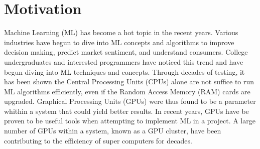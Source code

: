 \section*{Motivation}
\label{sec:Motivation}

Machine Learning (ML) has become a hot topic in the recent years. 
Various industries have begun to dive into ML concepts and algorithms  
to improve decision making, predict market sentiment, and understand consumers. 
College undergraduates and interested programmers have noticed this trend and have begun diving 
into ML techniques and concepts. Through decades of testing, it has been shown the 
Central Processing Units (CPUs) alone are not suffice to run ML algorithms efficiently, 
even if the Random Access Memory (RAM) cards are upgraded. Graphical Processing Units (GPUs) 
were thus found to be a parameter whithin a system that could yield better results. 
In recent years, GPUs have be proven to be useful tools when attempting to implement ML in a project. 
A large number of GPUs within a system, known as a GPU cluster, have been contributing to the efficiency 
of super computers for decades. 
